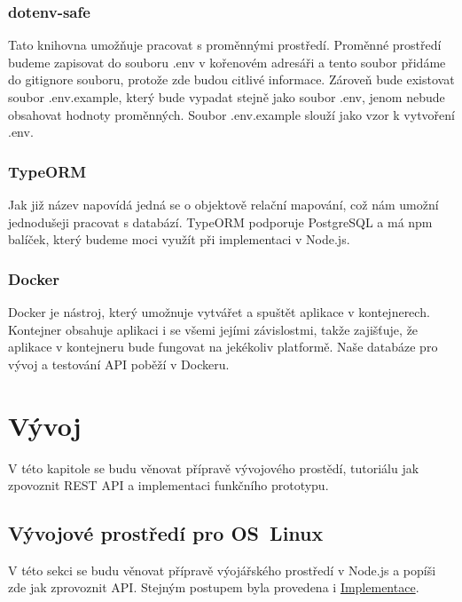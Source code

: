\documentclass[thesis=B,czech]{FITthesis}[2012/06/26]
\begin{document}
        \subsection{dotenv-safe}
            Tato knihovna umožňuje pracovat s proměnnými prostředí. Proměnné prostředí budeme zapisovat do souboru .env v kořenovém adresáři a tento soubor přidáme do gitignore souboru, protože zde budou citlivé informace. Zároveň bude existovat soubor .env.example, který bude vypadat stejně jako soubor .env, jenom nebude obsahovat hodnoty proměnných. Soubor .env.example slouží jako vzor k vytvoření .env. \cite{dotenv}
        \subsection{TypeORM}
            Jak již název napovídá jedná se o objektově relační mapování, což nám umožní jednodušeji pracovat s databází. TypeORM podporuje PostgreSQL a má npm balíček, který budeme moci využít při implementaci v Node.js.
            \cite{typeorm}
        \subsection{Docker}
            Docker je nástroj, který umožnuje vytvářet a spuštět aplikace v kontejnerech. Kontejner obsahuje aplikaci i se všemi jejími závislostmi, takže zajišťuje, že aplikace v kontejneru bude fungovat na jekékoliv platformě. Naše databáze pro vývoj a testování API poběží v Dockeru.
            \cite{docker}
\chapter{Vývoj}
    V této kapitole se budu věnovat přípravě vývojového prostědí, tutoriálu jak zpovoznit REST API a implementaci funkčního prototypu.
    \section{Vývojové prostředí pro OS~Linux}  \label{vyvProstredi}
        V této sekci se budu věnovat přípravě výojářského prostředí v Node.js a popíši zde jak zprovoznit API. Stejným postupem byla provedena i \hyperref[impl]{Implementace}.
        
\end{document}
